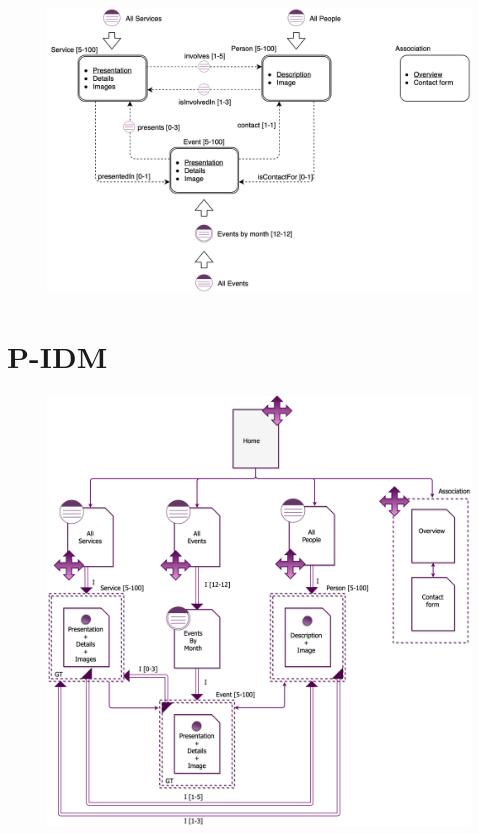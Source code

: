 \documentclass[a4paper, 11pt, parskip=half, headsepline]{scrreprt}
\begin{document}
\begin{figure}[H]
    \centering
    \includegraphics[width=1\linewidth, keepaspectratio]{IDM/L-IDM}
\end{figure}

\newpage
\section{P-IDM}

\begin{figure}[H]
    \centering
    \includegraphics[width=1\linewidth, keepaspectratio]{IDM/P-IDM}
\end{figure}
\end{document}
